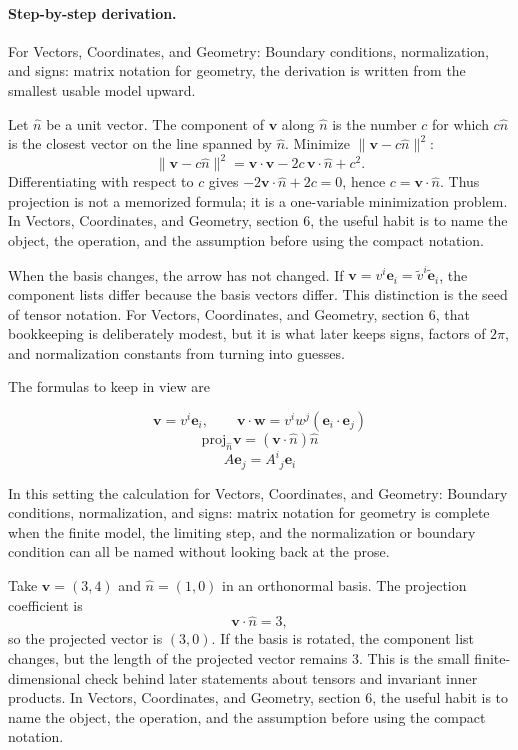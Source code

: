 \paragraph{Step-by-step derivation.}

For Vectors, Coordinates, and Geometry: Boundary conditions, normalization, and signs: matrix notation for geometry, the derivation is written from the smallest usable model upward.

Let \(\hat n\) be a unit vector.  The component of \(\bm v\) along \(\hat n\) is the number \(c\) for which \(c\hat n\) is the closest vector on the line spanned by \(\hat n\).  Minimize \(\|\bm v-c\hat n\|^2\):
\[
  \|\bm v-c\hat n\|^2=\bm v\cdot\bm v-2c\,\bm v\cdot\hat n+c^2.
\]
Differentiating with respect to \(c\) gives \(-2\bm v\cdot\hat n+2c=0\), hence \(c=\bm v\cdot\hat n\).  Thus projection is not a memorized formula; it is a one-variable minimization problem.  In Vectors, Coordinates, and Geometry, section 6, the useful habit is to name the object, the operation, and the assumption before using the compact notation.

When the basis changes, the arrow has not changed.  If \(\bm v=v^i\bm e_i=\tilde v^i\tilde{\bm e}_i\), the component lists differ because the basis vectors differ.  This distinction is the seed of tensor notation.  For Vectors, Coordinates, and Geometry, section 6, that bookkeeping is deliberately modest, but it is what later keeps signs, factors of \(2\pi\), and normalization constants from turning into guesses.

The formulas to keep in view are

\[
  \bm v=v^i\bm e_i,\qquad \bm v\cdot\bm w=v^iw^j(\bm e_i\cdot\bm e_j)
\]
\[
  \mathrm{proj}_{\hat n}\bm v=(\bm v\cdot\hat n)\hat n
\]
\[
  A\bm e_j=A^i{}_j\bm e_i
\]

In this setting the calculation for Vectors, Coordinates, and Geometry: Boundary conditions, normalization, and signs: matrix notation for geometry is complete when the finite model, the limiting step, and the normalization or boundary condition can all be named without looking back at the prose.




\begin{example}
Take \(\bm v=(3,4)\) and \(\hat n=(1,0)\) in an orthonormal basis.  The projection coefficient is
\[
  \bm v\cdot\hat n=3,
\]
so the projected vector is \((3,0)\).  If the basis is rotated, the component list changes, but the length of the projected vector remains \(3\).  This is the small finite-dimensional check behind later statements about tensors and invariant inner products.  In Vectors, Coordinates, and Geometry, section 6, the useful habit is to name the object, the operation, and the assumption before using the compact notation.
\end{example}



